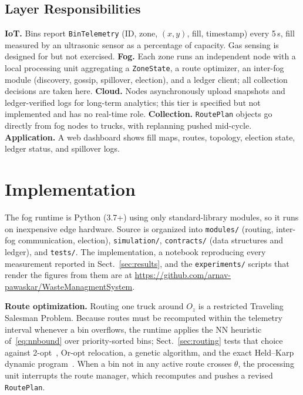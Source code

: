 \documentclass{llncs}
\begin{document}
\subsection{Layer Responsibilities}
\textbf{IoT.} Bins report \texttt{BinTelemetry} (ID, zone, $(x,y)$, fill,
timestamp) every 5\,s, fill measured by an ultrasonic sensor as a percentage of
capacity. Gas sensing is designed for but not exercised. \textbf{Fog.} Each
zone runs an independent node with a local processing unit aggregating a
\texttt{ZoneState}, a route optimizer, an inter-fog module (discovery, gossip,
spillover, election), and a ledger client; all collection decisions are taken
here. \textbf{Cloud.} Nodes asynchronously upload snapshots and
ledger-verified logs for long-term analytics; this tier is specified but not
implemented and has no real-time role. \textbf{Collection.}
\texttt{RoutePlan} objects go directly from fog nodes to trucks, with
replanning pushed mid-cycle. \textbf{Application.} A web dashboard shows fill
maps, routes, topology, election state, ledger status, and spillover logs.

\section{Implementation}
\label{sec:implementation}

The fog runtime is Python (3.7+) using only standard-library modules, so it
runs on inexpensive edge hardware. Source is organized into \texttt{modules/}
(routing, inter-fog communication, election), \texttt{simulation/},
\texttt{contracts/} (data structures and ledger), and \texttt{tests/}. The
implementation, a notebook reproducing every measurement reported in
Sect.~\ref{sec:results}, and the \texttt{experiments/} scripts that render the
figures from them are at
\url{https://github.com/arnav-pawaskar/WasteManagmentSystem}.

\textbf{Route optimization.} Routing one truck around $O_z$ is a restricted
Traveling Salesman Problem. Because routes must be recomputed within the
telemetry interval whenever a bin overflows, the runtime applies the NN
heuristic of~\eqref{eq:nnbound} over priority-sorted bins;
Sect.~\ref{sec:routing} tests that choice against 2-opt~\cite{croes}, Or-opt
relocation, a genetic algorithm, and the exact Held--Karp dynamic
program~\cite{heldkarp}. When a bin not in any active route crosses $\theta$,
the processing unit interrupts the route manager, which recomputes and pushes a
revised \texttt{RoutePlan}.
\end{document}

